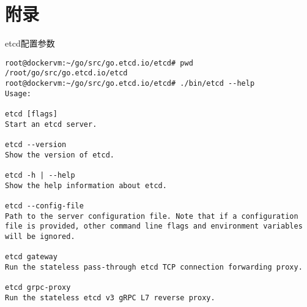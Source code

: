 \chapter{附录}
\mylineskip

\renewcommand{\theFancyVerbLine}{\sffamily\textcolor[rgb]{0.6,0.2,0.3}{\normalsize\oldstylenums{\arabic{FancyVerbLine}}}}
{\noindent etcd配置参数}\label{code_appendix_etcd_help}
\begin{verbatim}
root@dockervm:~/go/src/go.etcd.io/etcd# pwd
/root/go/src/go.etcd.io/etcd
root@dockervm:~/go/src/go.etcd.io/etcd# ./bin/etcd --help
Usage:

etcd [flags]
Start an etcd server.

etcd --version
Show the version of etcd.

etcd -h | --help
Show the help information about etcd.

etcd --config-file
Path to the server configuration file. Note that if a configuration file is provided, other command line flags and environment variables will be ignored.

etcd gateway
Run the stateless pass-through etcd TCP connection forwarding proxy.

etcd grpc-proxy
Run the stateless etcd v3 gRPC L7 reverse proxy.



\end{verbatim}
